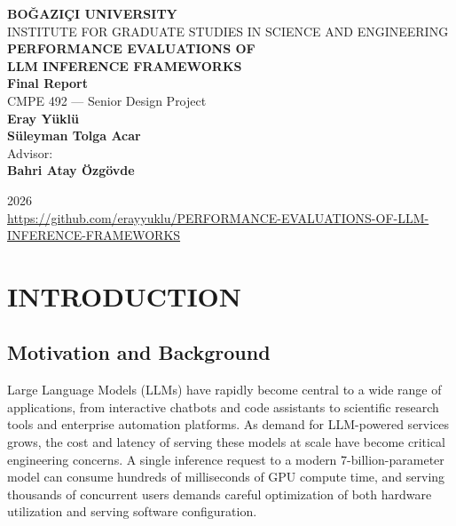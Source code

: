 \documentclass[a4paper,12pt]{report}
\begin{document}
\begin{titlepage}
\begin{center}
\vspace*{2cm}
{\Large \textbf{BO\u{G}AZI\c{C}I UNIVERSITY}}\\[0.4cm]
{\large INSTITUTE FOR GRADUATE STUDIES IN SCIENCE AND ENGINEERING}\\[2cm]
{\LARGE \textbf{PERFORMANCE EVALUATIONS OF}}\\[0.3cm]
{\LARGE \textbf{LLM INFERENCE FRAMEWORKS}}\\[1.5cm]
{\large \textbf{Final Report}}\\[1.5cm]
{\large CMPE 492 --- Senior Design Project}\\[2cm]
{\large \textbf{Eray Y\"{u}kl\"{u}}}\\[0.2cm]
{\large \textbf{S\"{u}leyman Tolga Acar}}\\[2cm]
{\large Advisor:}\\[0.2cm]
{\large \textbf{Bahri Atay \"{O}zg\"{o}vde}}

\vfill
{\large 2026}\\[0.5cm]
\url{https://github.com/erayyuklu/PERFORMANCE-EVALUATIONS-OF-LLM-INFERENCE-FRAMEWORKS}
\end{center}
\end{titlepage}
\tableofcontents

\chapter{INTRODUCTION}

\section{Motivation and Background}

Large Language Models (LLMs) have rapidly become central to a wide range of applications, from interactive chatbots and code assistants to scientific research tools and enterprise automation platforms. As demand for LLM-powered services grows, the cost and latency of serving these models at scale have become critical engineering concerns. A single inference request to a modern 7-billion-parameter model can consume hundreds of milliseconds of GPU compute time, and serving thousands of concurrent users demands careful optimization of both hardware utilization and serving software configuration.
\end{document}
